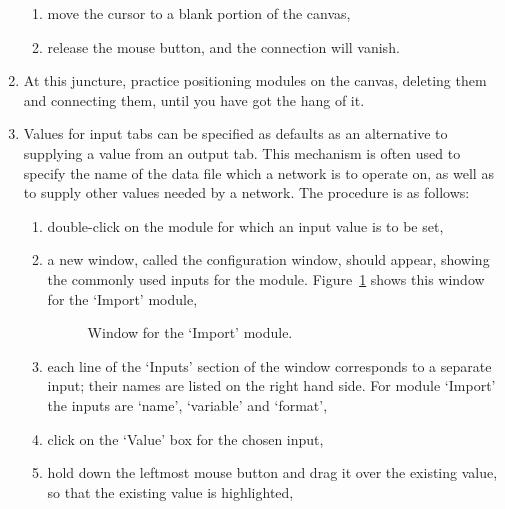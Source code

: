 \documentclass[twoside,11pt]{article}
\begin{document}
\begin{enumerate}
\begin{enumerate}
    \item move the cursor to a blank portion of the canvas,

    \item release the mouse button, and the connection will vanish.

  \end{enumerate}

  \item At this juncture, practice positioning modules on the canvas,
   deleting them and connecting them, until you have got the hang of it.

  \item Values for input tabs can be specified as defaults as an
   alternative to supplying a value from an output tab. This mechanism
   is often used to specify the name of the data file which a network
   is to operate on, as well as to supply other values needed by a
   network. The procedure is as follows:

  \begin{enumerate}

    \item double-click on the module for which an input value is to be set,

    \item a new window, called the configuration window, should appear,
     showing the commonly used inputs for the module. Figure~\ref{IMPORT}
     shows this window for the `Import' module,

    \begin{figure}[htbp]

    \begin{center}
    \leavevmode
    \epsfxsize=450pt
    \end{center}

    \caption[Window for the `Import' module.]{Window for the `Import'
     module.\label{IMPORT} }


    \end{figure}

    \item each line of the `Inputs' section of the window corresponds
     to a separate input; their names are listed on the right hand
     side. For module `Import' the inputs are `name', `variable' and
     `format',

    \item click on the `Value' box for the chosen input,

    \item hold down the leftmost mouse button and drag it over the
     existing value, so that the existing value is highlighted,


\end{enumerate}
\end{enumerate}
\end{document}
